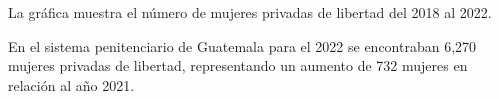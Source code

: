 La gráfica muestra el número de mujeres privadas de libertad del 2018 al 2022. 

En el sistema penitenciario de Guatemala para el 2022 se encontraban 6,270 mujeres privadas de libertad, representando un aumento de 732 mujeres en relación al año 2021. 